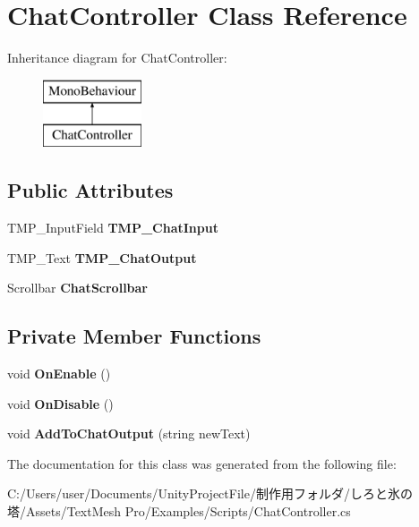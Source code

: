 \hypertarget{class_chat_controller}{}\section{Chat\+Controller Class Reference}
\label{class_chat_controller}
Inheritance diagram for Chat\+Controller\+:\begin{figure}[H]
\begin{center}
\leavevmode
\includegraphics[height=2.000000cm]{class_chat_controller}
\end{center}
\end{figure}
\subsection*{Public Attributes}
\begin{DoxyCompactItemize}
\item 
\mbox{\label{class_chat_controller_aa10d0f728b5a82ad62e48b0367c29054}} 
T\+M\+P\+\_\+\+Input\+Field {\bfseries T\+M\+P\+\_\+\+Chat\+Input}
\item 
\mbox{\label{class_chat_controller_aac379e56f05d9710d7363645e887f139}} 
T\+M\+P\+\_\+\+Text {\bfseries T\+M\+P\+\_\+\+Chat\+Output}
\item 
\mbox{\label{class_chat_controller_a76cac89a1da8d005d5da2e3a2a93de57}} 
Scrollbar {\bfseries Chat\+Scrollbar}
\end{DoxyCompactItemize}
\subsection*{Private Member Functions}
\begin{DoxyCompactItemize}
\item 
\mbox{\label{class_chat_controller_a3423082c1eb4fb566c5a6df99f5cee64}} 
void {\bfseries On\+Enable} ()
\item 
\mbox{\label{class_chat_controller_a14b6ba4660216ef76040803a6916740f}} 
void {\bfseries On\+Disable} ()
\item 
\mbox{\label{class_chat_controller_ad8da6957231dd7cb1b4f6cca65bd4112}} 
void {\bfseries Add\+To\+Chat\+Output} (string new\+Text)
\end{DoxyCompactItemize}


The documentation for this class was generated from the following file\+:\begin{DoxyCompactItemize}
\item 
C\+:/\+Users/user/\+Documents/\+Unity\+Project\+File/制作用フォルダ/しろと氷の塔/\+Assets/\+Text\+Mesh Pro/\+Examples/\+Scripts/Chat\+Controller.\+cs\end{DoxyCompactItemize}

